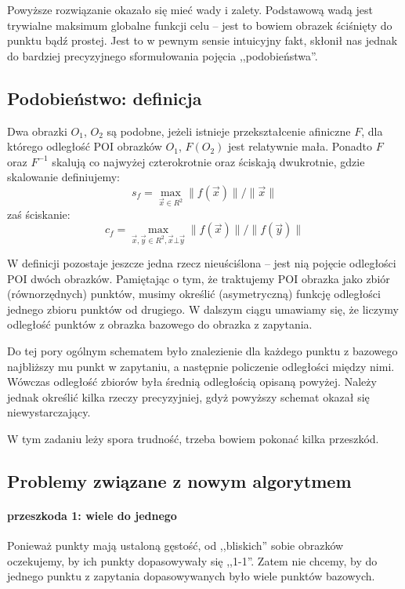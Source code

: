 \documentclass[a4paper,12pt,leqno]{article}
\begin{document}
Powyższe rozwiązanie okazało się mieć wady i zalety. Podstawową wadą jest trywialne maksimum globalne funkcji celu -- jest to bowiem obrazek ściśnięty do punktu bądź prostej. 
Jest to w pewnym sensie intuicyjny fakt, skłonił nas jednak do bardziej precyzyjnego sformułowania pojęcia ,,podobieństwa''. 

\subsection{Podobieństwo: definicja}
Dwa obrazki $O_1$, $O_2$ są podobne, jeżeli istnieje przekształcenie afiniczne $F$, dla którego odległość POI obrazków $O_1$, $F(O_2)$ jest relatywnie mała.
Ponadto $F$ oraz $F^{-1}$ skalują co najwyżej czterokrotnie oraz ściskają dwukrotnie, gdzie skalowanie definiujemy:
\[ s_f = \max_{\vec x \in R^2} \| f(\vec x) \| / \| \vec x \| \]
zaś ściskanie:
\[ c_f = \max_{\vec x, \vec y \in R^2, \vec x \bot \vec y} \| f(\vec x) \| / \| f(\vec y) \| \]

W definicji pozostaje jeszcze jedna rzecz nieuściślona -- jest nią pojęcie odległości POI dwóch obrazków. Pamiętając o tym, że traktujemy POI obrazka jako zbiór (równorzędnych) punktów, 
musimy określić (asymetryczną) funkcję odległości jednego zbioru punktów od drugiego.
W dalszym ciągu umawiamy się, że liczymy odległość punktów z obrazka bazowego do obrazka z zapytania.

Do tej pory ogólnym schematem było znalezienie dla każdego punktu z bazowego najbliższy mu punkt w zapytaniu, a następnie policzenie odległości między nimi.
Wówczas odległość zbiorów była średnią odległością opisaną powyżej.
Należy jednak określić kilka rzeczy precyzyjniej, gdyż powyższy schemat okazał się niewystarczający.

W tym zadaniu leży spora trudność, trzeba bowiem pokonać kilka przeszkód.

\subsection{Problemy związane z nowym algorytmem}
\paragraph{przeszkoda 1: wiele do jednego}
Ponieważ punkty mają ustaloną gęstość, od ,,bliskich'' sobie obrazków oczekujemy, by ich punkty dopasowywały się ,,1-1''. 
Zatem nie chcemy, by do jednego punktu z zapytania dopasowywanych było wiele punktów bazowych. 
\end{document}
